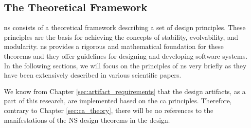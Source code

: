 \subsection{The Theoretical Framework} \label{subsec:ns_desing_theorems}

\gls{ns} consists of a theoretical framework describing a set of design principles. These
principles are the basis for achieving the concepts of stability, evolvability, and
modularity. \gls{ns} provides a rigorous and mathematical foundation for these theorems
and they offer guidelines for designing and developing software systems. In the following
sections, we will focus on the principles of \gls{ns} very briefly as they have been
extensively described in various scientific papers.

We know from Chapter \ref{sec:artifact_requirements} that the design artifacts, as a part
of this research, are implemented based on the \gls{ca} principles. Therefore, contrary to
Chapter \ref{sec:ca_theory}, there will be no references to the manifestations of the NS
design theorems in the design.
